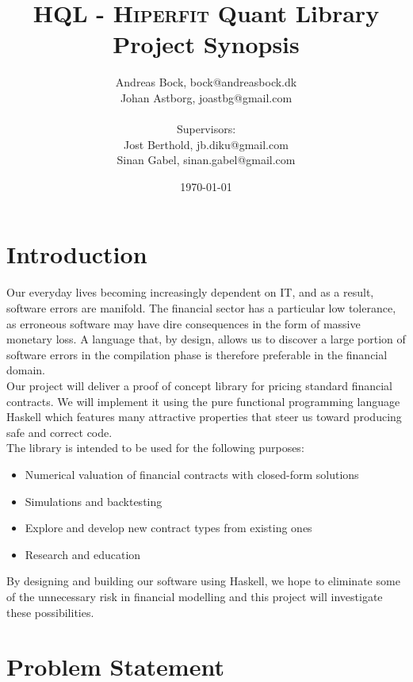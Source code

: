\documentclass[11pt]{article}
\makeatletter
\def\Author{Andreas Bock, bock@andreasbock.dk\\
Johan Astborg, joastbg@gmail.com\\\\
Supervisors:\\
Jost Berthold, jb.diku@gmail.com\\
Sinan Gabel, sinan.gabel@gmail.com
}
\def\Title{\bf HQL - \textsc{Hiperfit} Quant Library\\ {\Large Project Synopsis}}
\makeatother
\begin{document}
\title{\Title}
\author{\Author}
\date{\today}
\maketitle

\begin{abstract}


\end{abstract}

\section*{Introduction}

Our everyday lives becoming increasingly dependent on IT, and as a result, software
errors are manifold. The financial sector has a particular low tolerance, as erroneous
software may have dire consequences in the form of massive monetary loss. A language
that, by design, allows us to discover a large portion of software errors in 
the compilation phase is therefore preferable in the financial domain.\\

Our project will deliver a proof of concept library for pricing standard financial contracts.
We will implement it using the pure functional programming language Haskell which features
many attractive properties that steer us toward producing safe and correct code.\\

The library is intended to be used for the following purposes:

\begin{itemize}
\item Numerical valuation of financial contracts with closed-form solutions
\item Simulations and backtesting
\item Explore and develop new contract types from existing ones
\item Research and education
\end{itemize}

By designing and building our software using Haskell, we hope to eliminate some
of the unnecessary risk in financial modelling and this project will investigate these possibilities.\\

\section*{Problem Statement}
\end{document}
